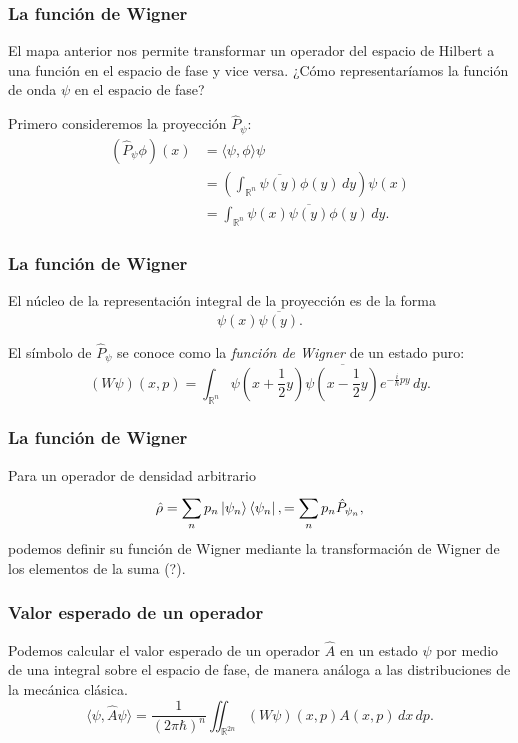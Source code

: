 \documentclass{beamer}
\DeclareMathOperator{\R}{\mathbb{R}}
\begin{document}
\begin{frame}
  \frametitle{La función de Wigner}

  El mapa anterior nos permite transformar un operador del
  espacio de Hilbert a una función en el espacio de fase y
  vice versa. ¿Cómo representaríamos la función de onda
  $\psi$ en el espacio de fase?

  Primero consideremos la proyección $\hat{P}_\psi$:
  \begin{align}
    (\hat{P}_\psi \phi)(x)
    &= \langle \psi, \phi \rangle \psi \\
    &= \left(
      \int_{\R^{n}} \overline{\psi(y)}\phi(y) \, dy
      \right) \psi(x) \\
    &= \int_{\R^{n}} \psi(x)\overline{\psi(y)} \phi(y) \,
    dy.
  \end{align}
\end{frame}

\begin{frame}
  \frametitle{La función de Wigner}

  El núcleo de la representación integral de la proyección
  es de la forma
  \[
    \psi(x) \overline{\psi(y)}.
  \] 

  El símbolo de $\hat{P}_\psi$ se conoce como la
  \textit{función de Wigner} de un estado puro:
  \begin{equation}
    (W\psi)(x,p)
    = \int_{\R^{n}} \psi\left( x + \frac{1}{2} y \right)
    \overline{\psi\left( x - \frac{1}{2}y \right) }
    e^{-\frac{i}{\hbar} p y} \, dy.
  \end{equation}
\end{frame}

\begin{frame}
  \frametitle{La función de Wigner}

  Para un operador de densidad arbitrario
  \[
    \hat{\rho}
    = \sum_{n}^{} p_n \ket{\psi_n} \bra{\psi_n},
    = \sum_{n}^{} p_n \hat{P}_{\psi_n},
  \] 
  podemos definir su función de Wigner mediante la
  transformación de Wigner de los elementos de la suma (?).
\end{frame}

\begin{frame}
  \frametitle{Valor esperado de un operador}

  Podemos calcular el valor esperado de un operador
  $\hat{A}$ en un estado $\psi$ por medio de una integral
  sobre el espacio de fase, de manera análoga a las
  distribuciones de la mecánica clásica.
  \begin{equation}
    \langle \psi, \hat{A}\psi \rangle
    = \frac{1}{(2\pi\hbar)^{n}} 
    \iint_{\R^{2n}} (W\psi)(x,p) A(x,p) \, dx \, dp.
  \end{equation}
\end{frame}
\end{document}
